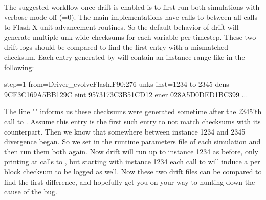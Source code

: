 The suggested workflow once drift is enabled is to first run both
simulations with verbose mode off (=0).  The main
 implementations have calls to
 between all calls to Flash-X unit advancement routines.
So the default behavior of drift will generate multiple unk-wide
checksums for each variable per timestep.  These two drift logs should be
compared to find the first entry with a mismatched checksum.  Each entry
generated by  will contain an instance range like in the
following:

\begin{codeseg}
step=1
from=Driver_evolveFlash.F90:276
unks inst=1234 to 2345
 dens 9CF3C169A5BB129C
 eint 9573173C3B51CD12
 ener 028A5D0DED1BC399
 ...
\end{codeseg}

The line "" informs us these checksums were generated
sometime after the 2345'th call to .  Assume this entry
is the first such entry to not match checksums with its counterpart.  Then
we know that somewhere between instance 1234 and 2345 divergence began.  So we
set  in the runtime parameters file of each
simulation and then run them both again.  Now drift will run up to instance
1234 as before, only printing at calls to , but starting
with instance 1234 each call to  will induce a per
block checksum to be logged as well.  Now these two drift files can be compared
to find the first difference, and hopefully get you on your way to hunting
down the cause of the bug.

